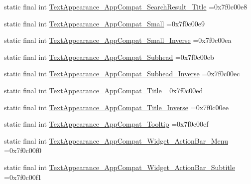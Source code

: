 \begin{DoxyCompactItemize}
\item 
static final int \mbox{\hyperlink{classbr_1_1unb_1_1cic_1_1mp_1_1marketmaster_1_1test_1_1R_1_1style_a5ab41fc7490457666bf9e7b6de97f6d7}{Text\+Appearance\+\_\+\+App\+Compat\+\_\+\+Search\+Result\+\_\+\+Title}} =0x7f0c00e8
\item 
static final int \mbox{\hyperlink{classbr_1_1unb_1_1cic_1_1mp_1_1marketmaster_1_1test_1_1R_1_1style_a383e1db46c4de8853b759e3d7fbb8e8e}{Text\+Appearance\+\_\+\+App\+Compat\+\_\+\+Small}} =0x7f0c00e9
\item 
static final int \mbox{\hyperlink{classbr_1_1unb_1_1cic_1_1mp_1_1marketmaster_1_1test_1_1R_1_1style_aa267276c35af482ecb7072bb1719277b}{Text\+Appearance\+\_\+\+App\+Compat\+\_\+\+Small\+\_\+\+Inverse}} =0x7f0c00ea
\item 
static final int \mbox{\hyperlink{classbr_1_1unb_1_1cic_1_1mp_1_1marketmaster_1_1test_1_1R_1_1style_a9aa36366ac9c79e25a404d3f8acb4e94}{Text\+Appearance\+\_\+\+App\+Compat\+\_\+\+Subhead}} =0x7f0c00eb
\item 
static final int \mbox{\hyperlink{classbr_1_1unb_1_1cic_1_1mp_1_1marketmaster_1_1test_1_1R_1_1style_aac18f3ab3bb8906c7a17d0ce1c271622}{Text\+Appearance\+\_\+\+App\+Compat\+\_\+\+Subhead\+\_\+\+Inverse}} =0x7f0c00ec
\item 
static final int \mbox{\hyperlink{classbr_1_1unb_1_1cic_1_1mp_1_1marketmaster_1_1test_1_1R_1_1style_aa74159c9d54e570d9d0ec41d7e22af31}{Text\+Appearance\+\_\+\+App\+Compat\+\_\+\+Title}} =0x7f0c00ed
\item 
static final int \mbox{\hyperlink{classbr_1_1unb_1_1cic_1_1mp_1_1marketmaster_1_1test_1_1R_1_1style_a09b27a7f45b4b7b9022d99ff8a47c6eb}{Text\+Appearance\+\_\+\+App\+Compat\+\_\+\+Title\+\_\+\+Inverse}} =0x7f0c00ee
\item 
static final int \mbox{\hyperlink{classbr_1_1unb_1_1cic_1_1mp_1_1marketmaster_1_1test_1_1R_1_1style_ab1ddd26b9c2178272a2ee7fc9cf319e8}{Text\+Appearance\+\_\+\+App\+Compat\+\_\+\+Tooltip}} =0x7f0c00ef
\item 
static final int \mbox{\hyperlink{classbr_1_1unb_1_1cic_1_1mp_1_1marketmaster_1_1test_1_1R_1_1style_a094d8857a7e855ef315fbd0745d806db}{Text\+Appearance\+\_\+\+App\+Compat\+\_\+\+Widget\+\_\+\+Action\+Bar\+\_\+\+Menu}} =0x7f0c00f0
\item 
static final int \mbox{\hyperlink{classbr_1_1unb_1_1cic_1_1mp_1_1marketmaster_1_1test_1_1R_1_1style_ae34ef8cf88e4c27bc6c2668a6114c556}{Text\+Appearance\+\_\+\+App\+Compat\+\_\+\+Widget\+\_\+\+Action\+Bar\+\_\+\+Subtitle}} =0x7f0c00f1
\item 

\end{DoxyCompactItemize}
